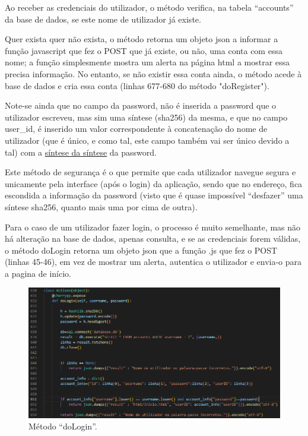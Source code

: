 \documentclass{report}
\begin{document}
Ao receber as credenciais do utilizador, o método verifica, na tabela “accounts” da base de dados, se este nome de utilizador já existe.

\linebreak
\bigskip

Quer exista quer não exista, o método retorna um objeto json a informar a função javascript que fez o POST que já existe, ou não, uma conta com essa nome; a função simplesmente mostra um alerta na página html a mostrar essa precisa informação. No entanto, se não existir essa conta ainda, o método acede à base de dados e cria essa conta (linhas 677-680 do método "doRegister").

\linebreak
\bigskip

Note-se ainda que no campo da password, não é inserida a password que o utilizador escreveu, mas sim uma síntese (sha256) da mesma, e que no campo user\_id, é inserido um valor correspondente à concatenação do nome de utilizador (que é único, e como tal, este campo também vai ser único devido a tal) com a \underline{síntese da síntese} da password. 

\linebreak
\bigskip

Este método de segurança é o que permite que cada utilizador navegue segura e unicamente pela interface (após o login) da aplicação, sendo que no endereço, fica escondida a informação da password (visto que é quase impossível “desfazer” uma síntese sha256, quanto mais uma por cima de outra).

\newpage

	Para o caso de um utilizador fazer login, o processo é muito semelhante, mas não há alteração na base de dados, apenas consulta, e se as credenciais forem válidas, o método doLogin retorna um objeto json que a função .js que fez o POST (linhas 45-46), em vez de mostrar um alerta, autentica o utilizador e envia-o para a pagina de início.



\begin{figure}[!hbtp]

        \includegraphics[scale=0.60]{Images_code/7 - login.png}
        \caption{\label{Estrutura}Método “doLogin”.}
\end{figure}
\end{document}
